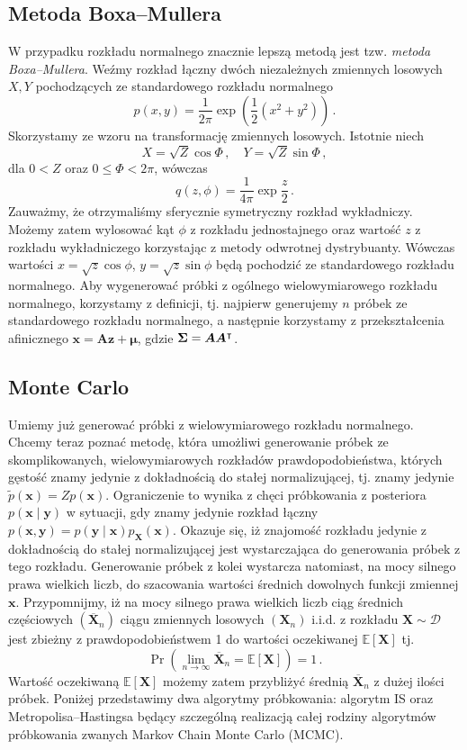 \documentclass{myclass}
\begin{document}
\subsection{Metoda Boxa--Mullera}

W przypadku rozkładu normalnego znacznie lepszą metodą jest tzw. \emph{metoda Boxa--Mullera}. Weźmy
rozkład łączny dwóch niezależnych zmiennych losowych \(X, Y\) pochodzących ze standardowego rozkładu
normalnego
\[
p(x, y) = \frac{1}{2\pi}\exp(\frac{1}{2}(x^2 + y^2))\,.
\]
Skorzystamy ze wzoru na transformację zmiennych losowych. Istotnie niech
\[
X = \sqrt{Z} \cos \Phi\,,\quad Y = \sqrt{Z} \sin \Phi\,,
\]
dla \(0 < Z\) oraz \( 0 \leq \Phi < 2\pi\), wówczas
\[
q(z, \phi) = \frac{1}{4\pi}\exp\frac{z}{2}\,.
\]
Zauważmy, że otrzymaliśmy sferycznie symetryczny rozkład wykładniczy. Możemy zatem wylosować kąt
\(\phi\) z rozkładu jednostajnego oraz wartość \(z\) z rozkładu wykładniczego korzystając z metody
odwrotnej dystrybuanty. Wówczas wartości \(x = \sqrt{z}\cos\phi\), \(y = \sqrt{z}\sin\phi\) będą
pochodzić ze standardowego rozkładu normalnego. Aby wygenerować próbki z ogólnego wielowymiarowego
rozkładu normalnego, korzystamy z definicji, tj. najpierw generujemy \(n\) próbek ze standardowego
rozkładu normalnego, a następnie korzystamy z przekształcenia afinicznego \(\bm{x} = \bm{A}\bm{z} +
\bm{\mu}\), gdzie \(\bm{\Sigma} = \bm{A}\bm{A}^\intercal\).

\subsection{Monte Carlo}

Umiemy już generować próbki z wielowymiarowego rozkładu normalnego. Chcemy teraz poznać metodę,
która umożliwi generowanie próbek ze skomplikowanych, wielowymiarowych rozkładów prawdopodobieństwa,
których gęstość znamy jedynie z dokładnością do stałej normalizującej, tj. znamy jedynie
\(\tilde{p}(\bm{x}) = Z p(\bm{x})\). Ograniczenie to wynika z chęci próbkowania z posteriora
\(p(\bm{x} \mid \bm{y})\) w sytuacji, gdy znamy jedynie rozkład łączny \(p(\bm{x}, \bm{y}) =
p(\bm{y} \mid \bm{x}) p_{\bm{X}}(\bm{x})\). Okazuje się, iż znajomość rozkładu jedynie z
dokładnością do stałej normalizującej jest wystarczająca do generowania próbek z tego rozkładu.
Generowanie próbek z kolei wystarcza natomiast, na mocy silnego prawa wielkich liczb, do szacowania
wartości średnich dowolnych funkcji zmiennej \(\bm{x}\). Przypomnijmy, iż na mocy silnego prawa
wielkich liczb ciąg średnich częściowych \((\overline{\bm{X}}_n)\) ciągu zmiennych losowych
\((\bm{X}_n)\) i.i.d. z rozkładu \(\bm{X} \sim \mathcal{D}\) jest zbieżny z prawdopodobieństwem 1 do
wartości oczekiwanej \(\mathbb{E}[\bm{X}]\) tj.
\[
\Pr\left(\lim_{n \to \infty} \overline{\bm{X}}_n = \mathbb{E}[\bm{X}]\right) = 1\,.
\]
Wartość oczekiwaną \(\mathbb{E}[\bm{X}]\) możemy zatem przybliżyć średnią \(\overline{\bm{X}}_n\) z
dużej ilości próbek. Poniżej przedstawimy dwa algorytmy próbkowania: algorytm IS oraz
Metropolisa--Hastingsa będący szczególną realizacją całej rodziny algorytmów próbkowania zwanych
Markov Chain Monte Carlo (MCMC).
\end{document}
